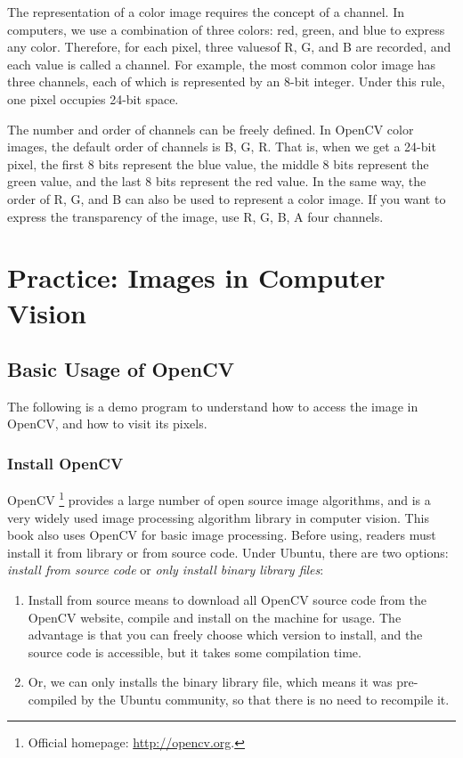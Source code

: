 The representation of a color image requires the concept of a channel. In computers, we use a combination of three colors: red, green, and blue to express any color. Therefore, for each pixel, three values ​​of R, G, and B are recorded, and each value is called a channel. For example, the most common color image has three channels, each of which is represented by an 8-bit integer. Under this rule, one pixel occupies 24-bit space.

The number and order of channels can be freely defined. In OpenCV color images, the default order of channels is B, G, R. That is, when we get a 24-bit pixel, the first 8 bits represent the blue value, the middle 8 bits represent the green value, and the last 8 bits represent the red value. In the same way, the order of R, G, and B can also be used to represent a color image. If you want to express the transparency of the image, use R, G, B, A four channels.

\section{Practice: Images in Computer Vision}
\subsection{Basic Usage of OpenCV}
The following is a demo program to understand how to access the image in OpenCV, and how to visit its pixels.

\subsubsection{Install OpenCV}
OpenCV \footnote {Official homepage: \url{http://opencv.org}. } provides a large number of open source image algorithms, and is a very widely used image processing algorithm library in computer vision. This book also uses OpenCV for basic image processing. Before using, readers must install it from library or from source code. Under Ubuntu, there are two options: \textit{install from source code} or \textit {only install binary library files}:

\begin{enumerate}
\item Install from source means to download all OpenCV source code from the OpenCV website, compile and install on the machine for usage. The advantage is that you can freely choose which version to install, and the source code is accessible, but it takes some compilation time.
\item Or, we can only installs the binary library file, which means it was pre-compiled by the Ubuntu community, so that there is no need to recompile it.
\end{enumerate}

